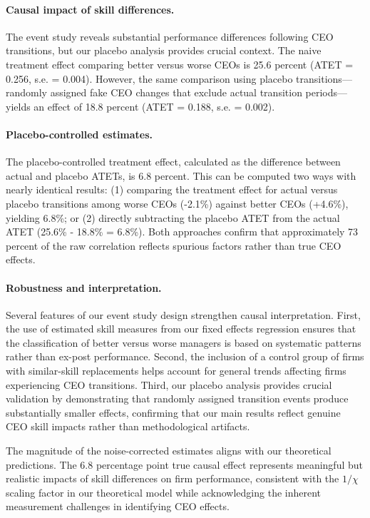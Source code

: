 \documentclass[11pt,a4paper]{article}
\begin{document}
\paragraph{Causal impact of skill differences.} The event study reveals substantial performance differences following CEO transitions, but our placebo analysis provides crucial context. The naive treatment effect comparing better versus worse CEOs is 25.6 percent (ATET = 0.256, s.e. = 0.004). However, the same comparison using placebo transitions---randomly assigned fake CEO changes that exclude actual transition periods---yields an effect of 18.8 percent (ATET = 0.188, s.e. = 0.002).

\paragraph{Placebo-controlled estimates.} The placebo-controlled treatment effect, calculated as the difference between actual and placebo ATETs, is 6.8 percent. This can be computed two ways with nearly identical results: (1) comparing the treatment effect for actual versus placebo transitions among worse CEOs (-2.1\%) against better CEOs (+4.6\%), yielding 6.8\%; or (2) directly subtracting the placebo ATET from the actual ATET (25.6\% - 18.8\% = 6.8\%). Both approaches confirm that approximately 73 percent of the raw correlation reflects spurious factors rather than true CEO effects.

\paragraph{Robustness and interpretation.} Several features of our event study design strengthen causal interpretation. First, the use of estimated skill measures from our fixed effects regression ensures that the classification of better versus worse managers is based on systematic patterns rather than ex-post performance. Second, the inclusion of a control group of firms with similar-skill replacements helps account for general trends affecting firms experiencing CEO transitions. Third, our placebo analysis provides crucial validation by demonstrating that randomly assigned transition events produce substantially smaller effects, confirming that our main results reflect genuine CEO skill impacts rather than methodological artifacts.

The magnitude of the noise-corrected estimates aligns with our theoretical predictions. The 6.8 percentage point true causal effect represents meaningful but realistic impacts of skill differences on firm performance, consistent with the $1/\chi$ scaling factor in our theoretical model while acknowledging the inherent measurement challenges in identifying CEO effects.
\end{document}
